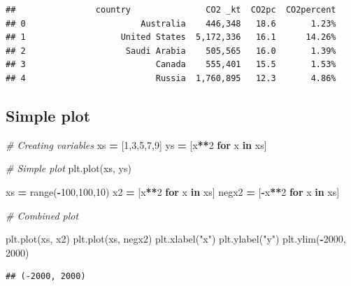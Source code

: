 \documentclass[]{book}
\newenvironment{Shaded}{\begin{snugshade}}{\end{snugshade}}
\newcommand{\BuiltInTok}[1]{#1}
\newcommand{\CommentTok}[1]{\textcolor[rgb]{0.56,0.35,0.01}{\textit{#1}}}
\newcommand{\ControlFlowTok}[1]{\textcolor[rgb]{0.13,0.29,0.53}{\textbf{#1}}}
\newcommand{\DecValTok}[1]{\textcolor[rgb]{0.00,0.00,0.81}{#1}}
\newcommand{\KeywordTok}[1]{\textcolor[rgb]{0.13,0.29,0.53}{\textbf{#1}}}
\newcommand{\NormalTok}[1]{#1}
\newcommand{\OperatorTok}[1]{\textcolor[rgb]{0.81,0.36,0.00}{\textbf{#1}}}
\newcommand{\StringTok}[1]{\textcolor[rgb]{0.31,0.60,0.02}{#1}}
\begin{document}
\begin{verbatim}
##                country               CO2 _kt  CO2pc  CO2percent
## 0                       Australia    446,348   18.6       1.23%
## 1                   United States  5,172,336   16.1      14.26%
## 2                    Saudi Arabia    505,565   16.0       1.39%
## 3                          Canada    555,401   15.5       1.53%
## 4                          Russia  1,760,895   12.3       4.86%
\end{verbatim}

\hypertarget{simple-plot}{%
\subsection{Simple plot}\label{simple-plot}}

\begin{Shaded}
\begin{Highlighting}[]
\CommentTok{# Creating variables}
\NormalTok{xs }\OperatorTok{=}\NormalTok{ [}\DecValTok{1}\NormalTok{,}\DecValTok{3}\NormalTok{,}\DecValTok{5}\NormalTok{,}\DecValTok{7}\NormalTok{,}\DecValTok{9}\NormalTok{]}
\NormalTok{ys }\OperatorTok{=}\NormalTok{ [x}\OperatorTok{**}\DecValTok{2} \ControlFlowTok{for}\NormalTok{ x }\KeywordTok{in}\NormalTok{ xs]}

\CommentTok{# Simple plot}
\NormalTok{plt.plot(xs, ys)}

\NormalTok{xs }\OperatorTok{=} \BuiltInTok{range}\NormalTok{(}\OperatorTok{-}\DecValTok{100}\NormalTok{,}\DecValTok{100}\NormalTok{,}\DecValTok{10}\NormalTok{)}
\NormalTok{x2 }\OperatorTok{=}\NormalTok{ [x}\OperatorTok{**}\DecValTok{2} \ControlFlowTok{for}\NormalTok{ x }\KeywordTok{in}\NormalTok{ xs]}
\NormalTok{negx2 }\OperatorTok{=}\NormalTok{ [}\OperatorTok{-}\NormalTok{x}\OperatorTok{**}\DecValTok{2} \ControlFlowTok{for}\NormalTok{ x }\KeywordTok{in}\NormalTok{ xs]}

\CommentTok{# Combined plot}

\NormalTok{plt.plot(xs, x2)}
\NormalTok{plt.plot(xs, negx2)}
\NormalTok{plt.xlabel(}\StringTok{"x"}\NormalTok{)}
\NormalTok{plt.ylabel(}\StringTok{"y"}\NormalTok{)}
\NormalTok{plt.ylim(}\OperatorTok{-}\DecValTok{2000}\NormalTok{, }\DecValTok{2000}\NormalTok{)}
\end{Highlighting}
\end{Shaded}

\begin{verbatim}
## (-2000, 2000)
\end{verbatim}
\end{document}
